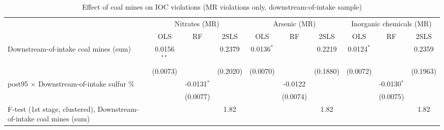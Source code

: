 
\begin{table}[htbp]
   
   \caption{\label{2sls_placebo_dwnstrmintake_minevio_mr_ivsum_binvio} Effect of coal mines on IOC violations (MR violations only, downstream-of-intake sample)}
   \bigskip
   
   \centering
   
   \begin{adjustbox}{width = \textwidth, center}
      
      
      \begin{tabular}{lccccccccc}
         \toprule
         
          & \multicolumn{3}{c}{Nitrates (MR)} & \multicolumn{3}{c}{Arsenic (MR)} & \multicolumn{3}{c}{Inorganic chemicals (MR)}\\
         
                                                                              & OLS           & RF            & 2SLS          & OLS           & RF            & 2SLS          & OLS           & RF            & 2SLS\\  
         
         \midrule 
         Downstream-of-intake coal mines (sum)                                & 0.0156$^{**}$ &               & 0.2379        & 0.0136$^{*}$  &               & 0.2219        & 0.0124$^{*}$  &               & 0.2359\\   
                                                                              & (0.0073)      &               & (0.2020)      & (0.0070)      &               & (0.1880)      & (0.0072)      &               & (0.1963)\\   
         post95 $\times$ Downstream-of-intake sulfur \%                       &               & -0.0131$^{*}$ &               &               & -0.0122       &               &               & -0.0130$^{*}$ &   \\   
                                                                              &               & (0.0077)      &               &               & (0.0074)      &               &               & (0.0075)      &   \\   
         
         F-test (1st stage, clustered), Downstream-of-intake coal mines (sum) &               &               & 1.82          &               &               & 1.82          &               &               & 1.82\\  
         

\end{tabular}
\end{adjustbox}
\end{table}
